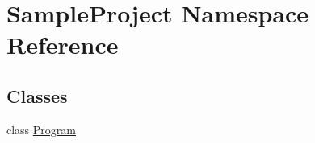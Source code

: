 \hypertarget{namespace_sample_project}{}\section{Sample\+Project Namespace Reference}
\label{namespace_sample_project}
\subsection*{Classes}
\begin{DoxyCompactItemize}
\item 
class \mbox{\hyperlink{class_sample_project_1_1_program}{Program}}
\end{DoxyCompactItemize}
